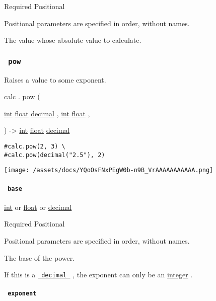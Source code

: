 {Required} {{ Positional }}

\label{functions-abs-value-positional-tooltip}
Positional parameters are specified in order, without names.

The value whose absolute value to calculate.

\subsubsection{\texorpdfstring{\texttt{\ pow\ }}{ pow }}\label{functions-pow}

Raises a value to some exponent.

calc { . } { pow } (

{ \href{/docs/reference/foundations/int/}{int}
\href{/docs/reference/foundations/float/}{float}
\href{/docs/reference/foundations/decimal/}{decimal} , } {
\href{/docs/reference/foundations/int/}{int}
\href{/docs/reference/foundations/float/}{float} , }

) -\textgreater{} \href{/docs/reference/foundations/int/}{int}
\href{/docs/reference/foundations/float/}{float}
\href{/docs/reference/foundations/decimal/}{decimal}

\begin{verbatim}
#calc.pow(2, 3) \
#calc.pow(decimal("2.5"), 2)
\end{verbatim}

\texttt{[image: /assets/docs/YQoOsFNxPEgW0b-n9B\_VrAAAAAAAAAAA.png]}

\paragraph{\texorpdfstring{\texttt{\ base\ }}{ base }}\label{functions-pow-base}

\href{/docs/reference/foundations/int/}{int} {or}
\href{/docs/reference/foundations/float/}{float} {or}
\href{/docs/reference/foundations/decimal/}{decimal}

{Required} {{ Positional }}

\label{functions-pow-base-positional-tooltip}
Positional parameters are specified in order, without names.

The base of the power.

If this is a
\href{/docs/reference/foundations/decimal/}{\texttt{\ decimal\ }} , the
exponent can only be an \href{/docs/reference/foundations/int/}{integer}
.

\paragraph{\texorpdfstring{\texttt{\ exponent\ }}{ exponent }}\label{functions-pow-exponent}

